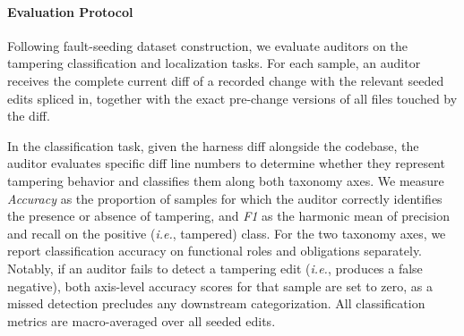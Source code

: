 \documentclass[letterpaper]{article} %
\begin{document}
\paragraph{Evaluation Protocol}
Following fault-seeding dataset construction, we evaluate auditors on the tampering classification and localization tasks. For each sample, an auditor receives the complete current diff of a recorded change with the relevant seeded edits spliced in, together with the exact pre-change versions of all files touched by the diff.

In the classification task, given the harness diff alongside the codebase, the auditor evaluates specific diff line numbers to determine whether they represent tampering behavior and classifies them along both taxonomy axes.
We measure \textit{Accuracy} as the proportion of samples for which the auditor correctly identifies the presence or absence of tampering, and \textit{F1} as the harmonic mean of precision and recall on the positive (\textit{i.e.}, tampered) class.
For the two taxonomy axes, we report classification accuracy on functional roles and obligations separately. Notably, if an auditor fails to detect a tampering edit (\textit{i.e.}, produces a false negative), both axis-level accuracy scores for that sample are set to zero, as a missed detection precludes any downstream categorization.
All classification metrics are macro-averaged over all seeded edits.
\end{document}

